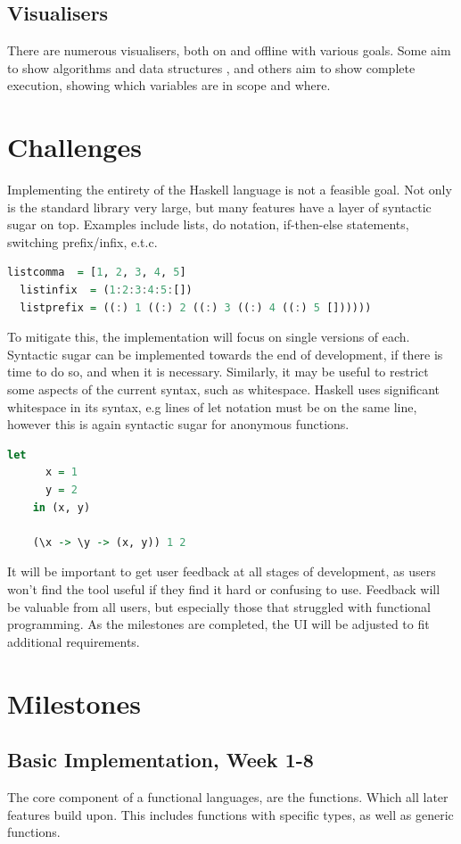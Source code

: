\documentclass[a4paper]{article}
\begin{document}
\subsection{Visualisers}
There are numerous visualisers, both on and offline with various goals. Some aim to show algorithms and data structures \cite{algo-vis}, and others \cite{cscircles-vis}aim to show complete execution, showing which variables are in scope and where.
\section{Challenges}
Implementing the entirety of the Haskell language is not a feasible goal. Not only is the standard library very large, but many features have a layer of syntactic sugar on top. Examples include lists, do notation, if-then-else statements, switching prefix/infix, e.t.c. 
\begin{lstlisting}[language=haskell, caption=Some of the ways to write a simple list.\cite{syntatic-sugar}]
  listcomma  = [1, 2, 3, 4, 5]
  listinfix  = (1:2:3:4:5:[])
  listprefix = ((:) 1 ((:) 2 ((:) 3 ((:) 4 ((:) 5 [])))))
\end{lstlisting}
To mitigate this, the implementation will focus on single versions of each. Syntactic sugar can be implemented towards the end of development, if there is time to do so, and when it is necessary.
Similarly, it may be useful to restrict some aspects of the current syntax, such as whitespace. Haskell uses significant whitespace in its syntax, e.g lines of let notation must be on the same line, however this is again syntactic sugar for anonymous functions.
\begin{lstlisting}[language=haskell, caption=let notation and the underlying meaning]
    let
      x = 1
      y = 2
    in (x, y)

    (\x -> \y -> (x, y)) 1 2
\end{lstlisting}

It will be important to get user feedback at all stages of development, as users won't find the tool useful if they find it hard or confusing to use. Feedback will be valuable from all users, but especially those that struggled with functional programming. As the milestones are completed, the UI will be adjusted to fit additional requirements.
\section{Milestones}
\subsection{Basic Implementation, Week 1-8}
The core component of a functional languages, are the functions. Which all later features build upon. This includes functions with specific types, as well as generic functions.
\end{document}
